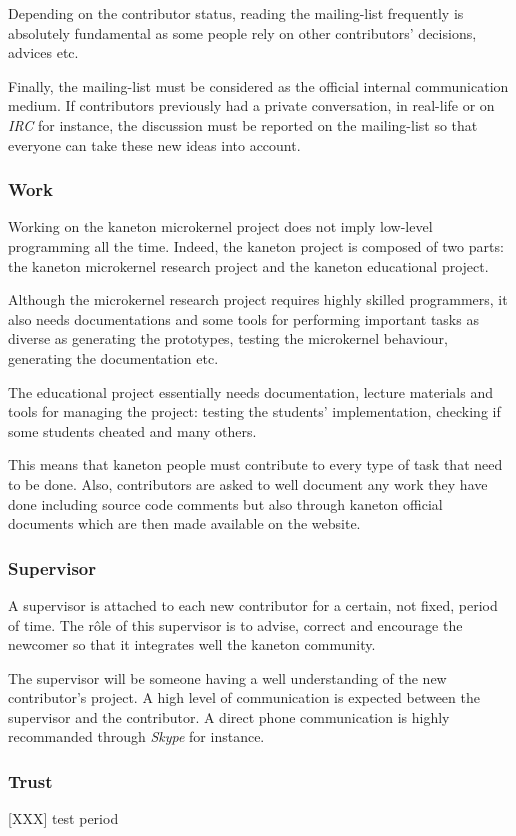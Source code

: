 Depending on the contributor status, reading the mailing-list frequently is
absolutely fundamental as some people rely on other contributors' decisions,
advices etc.

Finally, the mailing-list must be considered as the official internal
communication medium. If contributors previously had a private conversation,
in real-life or on \textit{IRC} for instance, the discussion must be reported
on the mailing-list so that everyone can take these new ideas into account.


\subsubsection{Work}

Working on the kaneton microkernel project does not imply low-level programming
all the time. Indeed, the kaneton project is composed of two parts: the
kaneton microkernel research project and the kaneton educational project.

Although the microkernel research project requires highly skilled programmers,
it also needs documentations and some tools for performing important tasks as
diverse as generating the prototypes, testing the microkernel behaviour,
generating the documentation etc.

The educational project essentially needs documentation, lecture materials
and tools for managing the project: testing the students' implementation,
checking if some students cheated and many others.

This means that kaneton people must contribute to every type of task
that need to be done. Also, contributors are asked to well document
any work they have done including source code comments but also through
kaneton official documents which are then made available on the website.


\subsubsection{Supervisor}

A supervisor is attached to each new contributor for a certain, not fixed,
period of time. The r\^ole of this supervisor is to advise, correct and
encourage the newcomer so that it integrates well the kaneton community.

The supervisor will be someone having a well understanding of the new
contributor's project. A high level of communication is expected between
the supervisor and the contributor. A direct phone communication is highly
recommanded through \textit{Skype} for instance.


\subsubsection{Trust}

[XXX] test period
